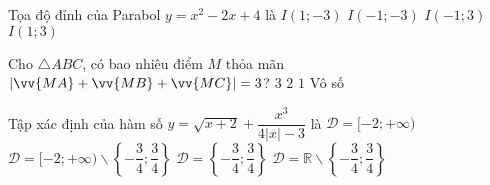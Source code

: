 \begin{ex}%
Tọa độ đỉnh của Parabol $y=x^2-2x+4$ là
\choice
{$I(1;-3)$}
{$I(-1;-3)$}
{$I(-1;3)$}
{\True $I(1;3)$}
\end{ex}

\begin{ex}%
Cho $\triangle ABC$, có bao nhiêu điểm $M$ thỏa mãn $\left|\vv{MA}+\vv{MB}+\vv{MC}\right|=3$?
\choice
{$3$}
{$2$}
{$1$}
{\True Vô số}
\end{ex}

\begin{ex}%
Tập xác định của hàm số $y=\sqrt{x+2}+\dfrac{x^3}{4|x|-3}$ là
\choice
{$\mathscr{D}=[-2;+\infty)$}
{\True $\mathscr{D}=[-2;+\infty)\backslash\left\{-\dfrac{3}{4};\dfrac{3}{4}\right\}$}
{$\mathscr{D}=\left\{-\dfrac{3}{4};\dfrac{3}{4}\right\}$}
{$\mathscr{D}=\mathbb R\backslash\left\{-\dfrac{3}{4};\dfrac{3}{4}\right\}$}
\loigiai{
Hàm số xác định $\Leftrightarrow\heva{& x+2\ge 0\\& 4|x|-3\ne0}\Leftrightarrow\heva{&x\ge-2\\& x\ne\pm\dfrac{3}{4}}\Rightarrow \mathscr{D}=[-2;+\infty)\backslash\left\{-\dfrac{3}{4};\dfrac{3}{4}\right\}$.
}
\end{ex}



